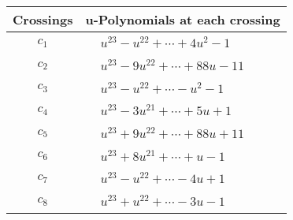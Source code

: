 \documentclass[1p]{elsarticle_modified}
\theoremstyle{definition}
\begin{document}
\begin{tabular}{m{50pt}|m{274pt}}
Crossings & \hspace{64pt}u-Polynomials at each crossing \\
\hline $$\begin{aligned}c_{1}\end{aligned}$$&$\begin{aligned}
&u^{23}- u^{22}+\cdots+4 u^2-1
\end{aligned}$\\
\hline $$\begin{aligned}c_{2}\end{aligned}$$&$\begin{aligned}
&u^{23}-9 u^{22}+\cdots+88 u-11
\end{aligned}$\\
\hline $$\begin{aligned}c_{3}\end{aligned}$$&$\begin{aligned}
&u^{23}- u^{22}+\cdots- u^2-1
\end{aligned}$\\
\hline $$\begin{aligned}c_{4}\end{aligned}$$&$\begin{aligned}
&u^{23}-3 u^{21}+\cdots+5 u+1
\end{aligned}$\\
\hline $$\begin{aligned}c_{5}\end{aligned}$$&$\begin{aligned}
&u^{23}+9 u^{22}+\cdots+88 u+11
\end{aligned}$\\
\hline $$\begin{aligned}c_{6}\end{aligned}$$&$\begin{aligned}
&u^{23}+8 u^{21}+\cdots+u-1
\end{aligned}$\\
\hline $$\begin{aligned}c_{7}\end{aligned}$$&$\begin{aligned}
&u^{23}- u^{22}+\cdots-4 u+1
\end{aligned}$\\
\hline $$\begin{aligned}c_{8}\end{aligned}$$&$\begin{aligned}
&u^{23}+u^{22}+\cdots-3 u-1
\end{aligned}$\\

\end{tabular}
\end{document}
